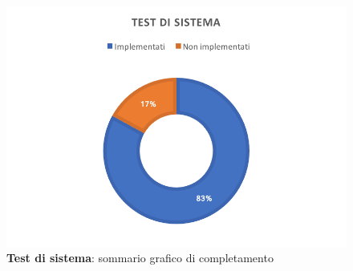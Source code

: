 \documentclass[../PianoDiQualifica_v4.0.0.tex]{subfiles}
\begin{document}
		\begin{figure}[!h]
			\centering
			\includegraphics{ImgTest/TS.png}
			\caption{\textbf{Test di sistema}: sommario grafico di completamento}
			\label{fig:pieTS}
		\end{figure}

	\newpage
\end{document}
